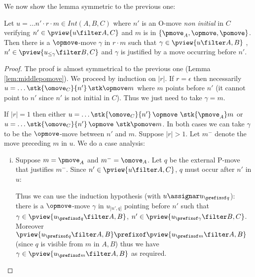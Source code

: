 We now show the lemma symmetric to the previous one:
\begin{lemma}
\label{lem:middleopmove}
Let $u = \ldots n' \cdot r \cdot m \in Int(A,B,C)$ where
$n'$ is an O-move \emph{non initial} in $C$ verifying $n' \in \pview{u\filter A,C}$ and $m$ is in $\{\pmove_A, \opmove, \pomove\}$. Then there is a $\opmove$-move $\gamma$ in $r \cdot m$ such that $\gamma \in \pview{u\filter A,B}$ , $n' \in \pview{u_{\leq \gamma} \filter B,C}$ and $\gamma$ is justified by a move occurring before $n'$.
\end{lemma}
\begin{proof}
The proof is almost symmetrical to the previous one (Lemma \ref{lem:middlepomove}). We proceed by induction on $|r|$.
If $r=\epsilon$ then necessarily $u = \ldots \stk {\omove_C} {n'} \thinspace\stk \opmove m$ where $m$ points before $n'$ (it cannot point to $n'$
since $n'$ is not initial in $C$). Thus we just need to take $\gamma = m$.

If $|r|=1$ then either
$u = \ldots \stk {\omove_C} {n'} \thinspace\opmove\thinspace\thinspace\stk{\pmove_A} m$
or $u = \ldots \stk {\omove_C} {n'} \thinspace\opmove\thinspace\thinspace\stk \pomove m$.
In both cases we can take $\gamma$ to be the $\opmove$-move between $n'$ and $m$.
Suppose $|r|>1$. Let $m^-$ denote the move preceding $m$ in $u$.
We do a case analysis:
\begin{enumerate}[i.]
\item Suppose $m = \pmove_A$ and $m^- = \omove_A$.
Let $q$ be the external P-move that justifies $m^-$.
Since $n' \in \pview{u\filter A,C}$, $q$ must occur after $n'$ in $u$:
\begin{center}
\end{center}

Thus we can use the induction hypothesis (with $u\assignar u_{\prefixof q}$): there is a $\opmove$-move $\gamma$
in $u_{]n',q]}$ pointing before $n'$ such that $\gamma \in \pview{u_{\prefixof q} \filter A,B}$, $n' \in \pview{u_{\prefixof \gamma} \filter B,C}$.
Moreover $\pview{u_{\prefixof q} \filter A,B} \prefixof \pview{u_{\prefixof m} \filter A,B}$ (since $q$ is visible from $m$ in $A,B$) thus we have $\gamma \in \pview{u_{\prefixof m} \filter A,B}$ as required.


\end{enumerate}
\end{proof}
